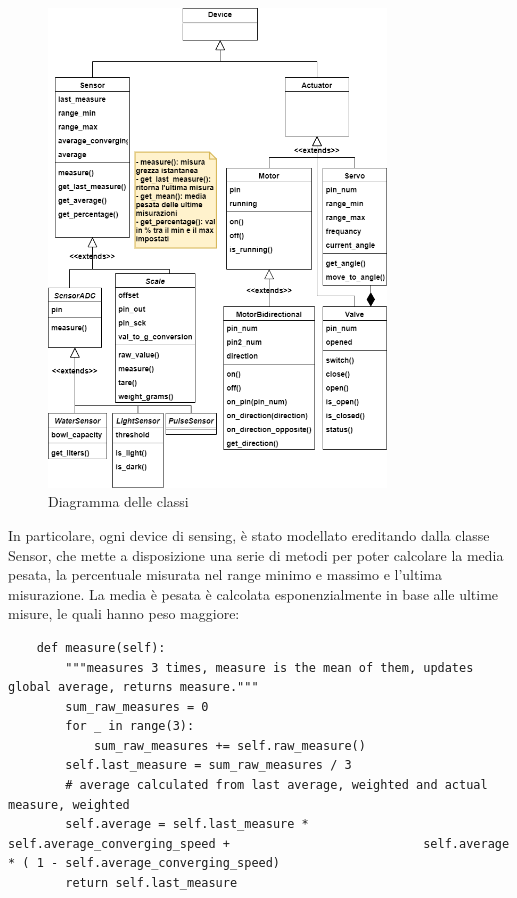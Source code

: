     \begin{figure}[H]
        \caption{Diagramma delle classi}
        \label{fig:classdiagram}
        \centering
        \includegraphics[width=0.8\textwidth]{DrawIo/ClassDiagram.png}
    \end{figure}
    
    In particolare, ogni device di sensing, è stato modellato ereditando dalla classe Sensor, che mette a disposizione una serie di metodi per poter calcolare la media pesata, la percentuale misurata nel range minimo e massimo e l'ultima misurazione. La media è pesata è calcolata esponenzialmente in base alle ultime misure, le quali hanno peso maggiore:
    \begin{lstlisting}
    def measure(self):
        """measures 3 times, measure is the mean of them, updates global average, returns measure."""
        sum_raw_measures = 0
        for _ in range(3):
            sum_raw_measures += self.raw_measure()
        self.last_measure = sum_raw_measures / 3
        # average calculated from last average, weighted and actual measure, weighted
        self.average = self.last_measure * self.average_converging_speed +                           self.average * ( 1 - self.average_converging_speed)
        return self.last_measure
    \end{lstlisting}
  
